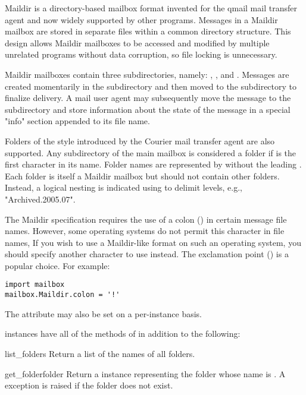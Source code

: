 Maildir is a directory-based mailbox format invented for the qmail mail
transfer agent and now widely supported by other programs. Messages in a
Maildir mailbox are stored in separate files within a common directory
structure. This design allows Maildir mailboxes to be accessed and modified by
multiple unrelated programs without data corruption, so file locking is
unnecessary.

Maildir mailboxes contain three subdirectories, namely: , ,
and . Messages are created momentarily in the  subdirectory
and then moved to the  subdirectory to finalize delivery. A mail user
agent may subsequently move the message to the  subdirectory and
store information about the state of the message in a special "info" section
appended to its file name.

Folders of the style introduced by the Courier mail transfer agent are also
supported. Any subdirectory of the main mailbox is considered a folder if
 is the first character in its name. Folder names are represented
by  without the leading . Each folder is itself a
Maildir mailbox but should not contain other folders. Instead, a logical
nesting is indicated using  to delimit levels, e.g.,
"Archived.2005.07".

\begin{notice}
The Maildir specification requires the use of a colon (\character{:}) in
certain message file names. However, some operating systems do not permit this
character in file names, If you wish to use a Maildir-like format on such an
operating system, you should specify another character to use instead. The
exclamation point (\character{!}) is a popular choice. For example:
\begin{verbatim}
import mailbox
mailbox.Maildir.colon = '!'
\end{verbatim}
The  attribute may also be set on a per-instance basis.
\end{notice}

 instances have all of the methods of  in
addition to the following:

\begin{methoddesc}{list_folders}{}
Return a list of the names of all folders.
\end{methoddesc}

\begin{methoddesc}{get_folder}{folder}
Return a  instance representing the folder whose name is
. A  exception is raised if the
folder does not exist.
\end{methoddesc}


